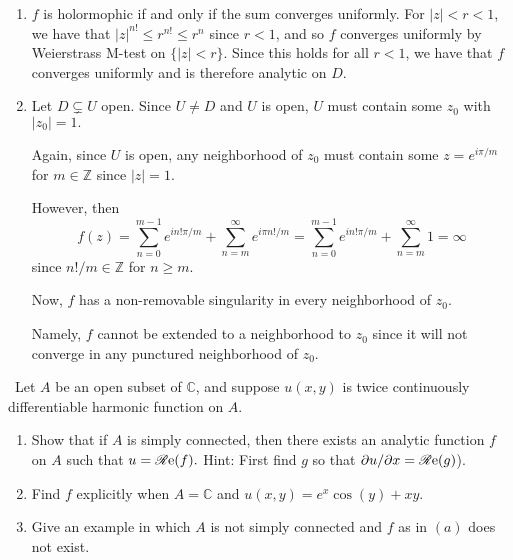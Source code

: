 \documentclass[12pt]{Qual}
\begin{document}
\begin{solution}$\,$
\begin{enumerate}[label=(\alph*)]
    \item $f$ is holormophic if and only if the sum converges uniformly. For $|z|<r<1$, we have that $|z|^{n!}\le r^{n!}\le r^n$ since $r<1$, and so $f$ converges uniformly by Weierstrass M-test on $\{|z|<r\}.$ Since this holds for all $r<1$, we have that $f$ converges uniformly and is therefore analytic on $D.$
    \item Let $D\subsetneq U$ open. Since $U\not=D$ and $U$ is open, $U$ must contain some $z_0$ with $|z_0|=1.$

    Again, since $U$ is open, any neighborhood of $z_0$ must contain some $z=e^{i\pi/m}$ for $m\in\mathbb{Z}$ since $|z|=1.$

    However, then $$f(z)=\sum_{n=0}^{m-1}e^{in!\pi/m}+\sum_{n=m}^\infty e^{i\pi n!/m}=\sum_{n=0}^{m-1}e^{in!\pi/m}+\sum_{n=m}^\infty 1=\infty$$ since $n!/m\in\mathbb{Z}$ for $n\ge m.$

    Now, $f$ has a non-removable singularity in every neighborhood of $z_0$.

    Namely, $f$ cannot be extended to a neighborhood to $z_0$ since it will not converge in any punctured neighborhood of $z_0.$
\end{enumerate}
\end{solution}
\newpage




\begin{problem} $\,$
Let $A$ be an open subset of $\mathbb{C}$, and suppose $u(x,y)$ is twice continuously differentiable harmonic function on $A.$
\begin{enumerate}[label=(\alph*)]
    \item Show that if $A$ is simply connected, then there exists an analytic function $f$ on $A$ such that $u=\mathscr{R}\text{e}(f).$ Hint: First find $g$ so that $\partial u/\partial x=\mathscr{R}\text{e}(g)$).
    \item Find $f$ explicitly when $A=\mathbb{C}$ and $u(x,y)=e^x\cos(y)+xy$.
    \item Give an example in which $A$ is not simply connected and $f$ as in $(a)$ does not exist.
\end{enumerate}
\end{problem}
\end{document}
